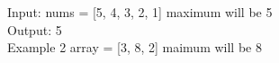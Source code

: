 \documentclass[preview]{standalone}
\begin{document}
Input: nums = [5, 4, 3, 2, 1] maximum will be 5\\Output: 5\\Example 2 array = [3, 8, 2] maimum will be 8\\
\end{document}

